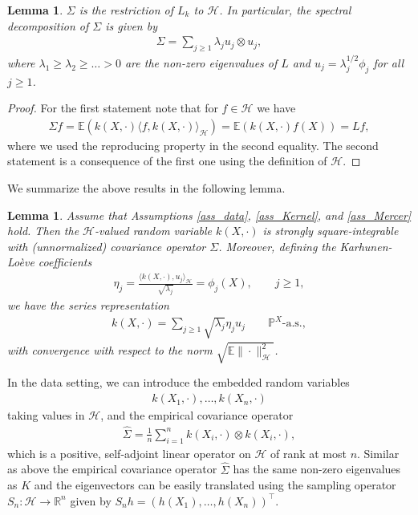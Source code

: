 \documentclass[a4paper,11pt]{article} %
\numberwithin{equation}{section}
\theoremstyle{definition}
\theoremstyle{remark}
\theoremstyle{plain}
\newtheorem{lemma}[definition]{Lemma}
\begin{document}
\begin{lemma}
  \label{lem_L_Sigma}
  $\Sigma$ is the restriction of $L_k$ to $\mathcal{H}$. In particular, the spectral decomposition of $\Sigma$ is given by
  \begin{align}
    \Sigma=\sum_{j\geq 1}\lambda_j u_j\otimes u_j,
  \end{align}
  where $\lambda_1\geq \lambda_2\geq \dots>0$ are the non-zero eigenvalues of $L$ and $u_j=\lambda_j^{1/2}\phi_j$ for all $j\geq 1$.
\end{lemma}

\begin{proof}
  For the first statement note that for $f\in\mathcal{H}$ we have
  \begin{align}
      \Sigma f 
    = \mathbb{E} (k(X,\cdot) \langle f, k(X, \cdot) \rangle_{\mathcal{H}}) 
    = \mathbb{E} (k(X,\cdot)f(X))
    = L f,
  \end{align}
  where we used the reproducing property in the second equality.
  The second statement is a consequence of the first one using the definition of $\mathcal{H}$.
\end{proof}

We summarize the above results in the following lemma.

\begin{lemma}
\label{lem:KL}
  Assume that Assumptions \ref{ass_data}, \ref{ass_Kernel}, and \ref{ass_Mercer} hold. Then the $\mathcal{H}$-valued random variable $k(X,\cdot)$ is strongly square-integrable with (unnormalized) covariance operator $\Sigma$. Moreover, defining the Karhunen-Loève coefficients 
  \begin{align}
        \eta_j=\frac{\langle k(X,\cdot),u_j\rangle_{\mathcal{H}}}{\sqrt{\lambda_j}}=\phi_j(X),\qquad j\geq 1,
    \end{align}
    we have the series representation
  \begin{align}
        k(X,\cdot)=\sum_{j\geq1}\sqrt{\lambda_j}\eta_ju_j\qquad \mathbb{P}^X\text{-a.s.},
    \end{align}
    with convergence with respect to the norm $\sqrt{\mathbb{E}\|\cdot\|^2_\mathcal{H}}$.
\end{lemma}


In the data setting, we can introduce the embedded random variables 
\begin{align}
k(X_1, \cdot), \dots, k(X_n, \cdot)    
\end{align} 
taking values in $ \mathcal{H} $, and the empirical covariance operator 
\begin{align}
  \widehat\Sigma=\frac{1}{n}\sum_{i=1}^nk(X_i,\cdot)\otimes k(X_i,\cdot),
\end{align}
which is a positive, self-adjoint linear operator on \( \mathcal{H} \) of rank at most $ n $.
Similar as above the empirical covariance operator $\widehat\Sigma$ has the same non-zero eigenvalues as $K$ and the eigenvectors can be easily translated using the sampling operator $ S_{n}: \mathcal{H} \to \mathbb{R}^n $ given by $ S_nh = (h(X_1), \dots, h(X_n))^\top$.
\end{document}
